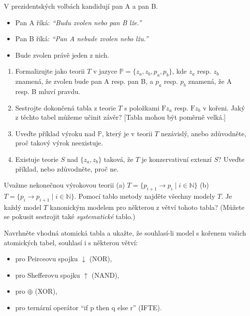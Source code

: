 \documentclass[a4paper,12pt]{article}
\begin{document}
    
    \medskip\begin{problem} %
    V prezidentských volbách kandidují pan A a pan B.
    \begin{itemize}
    \item Pan A říká: {\it ``Budu zvolen nebo pan B lže.''}
    \item Pan B říká: {\it ``Pan A nebude zvolen nebo lžu.''}
    \item Bude zvolen právě jeden z nich.
    \end{itemize}
    \begin{enumerate}
    \item Formalizujte jako teorii $T$ v jazyce $\mathbb P=\{z_a,z_b,p_a,p_b\}$, kde $z_a$ resp. $z_b$ znamená, že zvolen bude pan A resp. pan B, a $p_a$ resp. $p_b$ znamená, že A resp. B mluví pravdu.
    \item Sestrojte dokončená tabla z teorie $T$ s položkami $\mathrm{F}z_a$ resp. $\mathrm{F}z_b$ v kořeni. Jaký z těchto tabel můžeme učinit závěr? [Tabla mohou být poměrně velká.]
    \item Uveďte příklad výroku nad $\mathbb{P}$, který je v teorii $T$ nezávislý, anebo zdůvodněte, proč takový výrok neexistuje.
    \item Existuje teorie $S$ nad $\{z_a,z_b\}$ taková, že $T$ je konzervativní extenzí $S$? Uveďte příklad, nebo zdůvodněte, proč ne.
    \end{enumerate}
\end{problem}


\medskip\begin{problem}
    Uvažme nekonečnou výrokovou teorii (a) $T=\{p_{i+1} \to p_i\mid i\in \mathbb{N}\}$ (b) $T=\{p_i \to p_{i+1}\mid i\in \mathbb{N}\}$. Pomocí tablo metody najděte všechny modely $T$. Je každý model $T$ kanonickým modelem pro některou z větví tohoto tabla? (Můžete se pokusit sestrojit také \emph{systematické} tablo.)
\end{problem}


\medskip\begin{problem} 
    Navrhněte vhodná atomická tabla a ukažte, že souhlasí-li model s kořenem vašich atomických tabel, souhlasí i s některou větví:
    \begin{itemize}
        \item pro Peirceovu spojku $\downarrow$ (NOR),
        \item pro Shefferovu spojku $\uparrow$ (NAND),
        \item pro $\oplus$ (XOR),
        \item pro ternární operátor ``if p then q else r'' (IFTE).
    \end{itemize}  
    
\end{problem}
\end{document}
